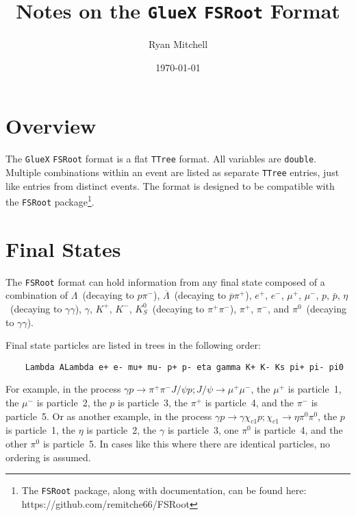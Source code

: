 \documentclass[11pt]{article}
\begin{document}
\title{Notes on the {\tt GlueX} {\tt FSRoot} Format}
\author{Ryan Mitchell}
\date{\today}
\maketitle



\tableofcontents

\parindent 0pt
\parskip 10pt

\section{Overview}

The {\tt GlueX} {\tt FSRoot} format is a flat {\tt TTree} format.  All variables are {\tt double}.  Multiple combinations within an event are listed as separate {\tt TTree} entries, just like entries from distinct events.  The format is designed to be compatible with the {\tt FSRoot} package\footnote{The {\tt FSRoot} package, along with documentation, can be found here: https://github.com/remitche66/FSRoot}.


\section{Final States}
\label{sec:fs}

The {\tt FSRoot} format can hold information from any final state composed of a combination of $\Lambda$~(decaying to $p\pi^-$), $\overline\Lambda$~(decaying to $\overline{p}\pi^+$), $e^+$, $e^-$, $\mu^+$, $\mu^-$, $p$, $\bar{p}$, $\eta$~(decaying to $\gamma\gamma$), $\gamma$, $K^+$, $K^-$,
$K^0_S$~(decaying to $\pi^+\pi^-$), $\pi^+$, $\pi^-$, and $\pi^0$~(decaying to $\gamma\gamma$). 

Final state particles are listed in trees in the following order:  
\begin{verbatim}
    Lambda ALambda e+ e- mu+ mu- p+ p- eta gamma K+ K- Ks pi+ pi- pi0
\end{verbatim}
For example, in the process $\gamma p\to\pi^+\pi^-J/\psi p; J/\psi\to\mu^+\mu^-$, the $\mu^+$ is particle~1, the $\mu^-$ is particle~2, the $p$ is particle~3, the $\pi^+$ is particle~4, and the $\pi^-$ is particle~5. Or as another example, in the process $\gamma p\to\gamma\chi_{c1}p; \chi_{c1}\to\eta\pi^0\pi^0$, the $p$ is particle~1, the $\eta$ is particle~2, the $\gamma$ is particle~3, one $\pi^0$ is particle~4, and the other $\pi^0$ is particle~5.  In cases like this where there are identical particles, no ordering is assumed.
\end{document}
